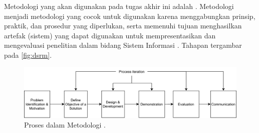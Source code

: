 Metodologi yang akan digunakan pada tugas akhir ini adalah \dsrmfull. Metodologi \dsrm{} menjadi metodologi yang cocok untuk digunakan karena menggabungkan prinsip, praktik, dan prosedur yang diperlukan, serta memenuhi tujuan menghasilkan artefak (sistem) yang dapat digunakan untuk mempresentasikan dan mengevaluasi penelitian dalam bidang Sistem Informasi \parencite{peffers2007dsrm}. Tahapan \dsrm{} tergambar pada \autoref{fig:dsrm}.

\begin{figure}[htbp]
	\centering
	\includegraphics[width=.8\textwidth]{images/dsrm.png}
	\caption{Proses dalam Metodologi \dsrm{} \parencite{peffers2007dsrm}.}
	\label{fig:dsrm}
\end{figure}

